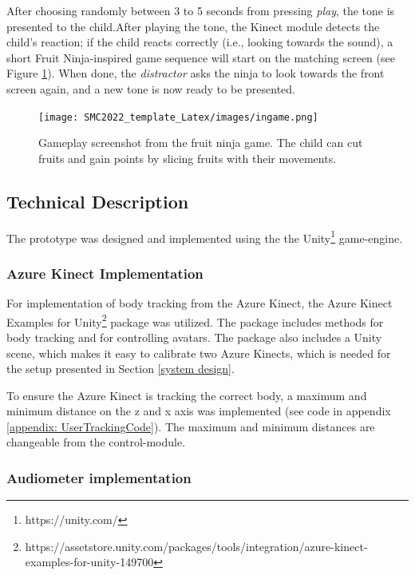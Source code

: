 After choosing randomly between 3 to 5 seconds from pressing \textit{play}, the tone is presented to the child.After playing the tone, the Kinect module detects  the child's reaction; if the child reacts correctly (i.e., looking towards the sound), a short Fruit Ninja-inspired game sequence will start on the matching screen (see Figure \ref{fig:fruitNinjaGame}). When done, the \textit{distractor} asks the ninja to look towards the front screen again, and a new tone is now ready to be presented. \newline

\begin{figure}[h]
    \centering   \texttt{[image: SMC2022\_template\_Latex/images/ingame.png]}
    \caption{Gameplay screenshot from the fruit ninja game. The child can cut fruits and gain points by slicing fruits with their movements.}
    \label{fig:fruitNinjaGame}
\end{figure}


\subsection{Technical Description} \label{technicalDescription}
The prototype was designed and implemented using the
the Unity\footnote{https://unity.com/} game-engine.

\subsubsection{Azure Kinect Implementation}
For implementation of body tracking from the Azure Kinect, the Azure Kinect Examples for Unity\footnote{https://assetstore.unity.com/packages/tools/integration/azure-kinect-examples-for-unity-149700} package was utilized. The package includes methods for body tracking and for controlling avatars. The package also includes a Unity scene, which makes it easy to calibrate two Azure Kinects, which is needed for the setup presented in Section \ref{system design}. \newline

To ensure the Azure Kinect is tracking the correct body, a maximum and minimum distance on the z and x axis was implemented (see code in appendix \ref{appendix: UserTrackingCode}). The maximum and minimum distances are changeable from the control-module. 

\label{SoundImplementation}
\subsubsection{Audiometer implementation}

